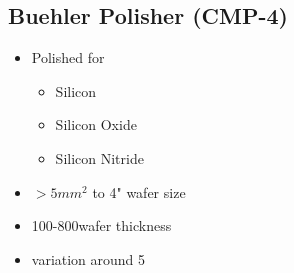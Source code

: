 \subsection{Buehler Polisher (CMP-4)}\label{cmp_machine_semi_clean}
\WaferSemiClean

\begin{itemize}
	\item Polished for
	\begin{itemize}
		\item Silicon
		\item Silicon Oxide 
		\item Silicon Nitride
	\end{itemize}
	\item $>5mm^2$ to 4" wafer size
	\item 100-800\um wafer thickness
	\item variation around 5\um
\end{itemize}
